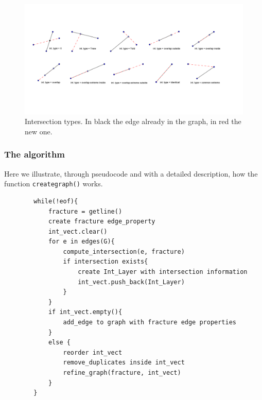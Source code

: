 \documentclass[10pt]{article} %
\begin{document}
	\begin{figure}
		\centering 
		\includegraphics[width=1\textwidth]{"int_type"}
		\caption{Intersection types. In black the edge already in the graph, in red the new one.}
		\label{fig:frac_int_type}
	\end{figure}
	\subsubsection{The algorithm}
	Here we illustrate, through pseudocode 
	and with a detailed description, how the function \texttt{create\textunderscore graph()} works.
		\begin{lstlisting}
		while(!eof){
			fracture = getline()
			create fracture edge_property 
			int_vect.clear()
			for e in edges(G){
				compute_intersection(e, fracture)
				if intersection exists{
					create Int_Layer with intersection information
					int_vect.push_back(Int_Layer)
				}	
			}
			if int_vect.empty(){
				add_edge to graph with fracture edge properties
			} 
			else {
				reorder int_vect
				remove_duplicates inside int_vect
				refine_graph(fracture, int_vect)  
			}
		}
		\end{lstlisting}
\end{document}
